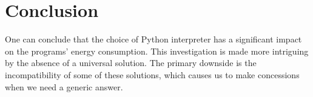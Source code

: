 \section{Conclusion}
One can conclude that the choice of Python interpreter has a significant impact on the programs' energy consumption.
This investigation is made more intriguing by the absence of a universal solution.
The primary downside is the incompatibility of some of these solutions, which causes us to make concessions when we need a generic answer.
